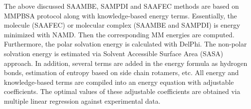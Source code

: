 \documentclass[9pt,tutorial,pubversion]{livecoms}
\begin{document}
The above discussed SAAMBE, SAMPDI and SAAFEC methods are based on MMPBSA protocol along with knowledge-based energy terms. Essentially, the molecule (SAAFEC) or molecular complex (SAAMBE and SAMPDI) is energy minimized with NAMD. Then the corresponding MM energies are computed. Furthermore, the polar solvation energy is calculated with DelPhi. The non-polar solvation energy is estimated via Solvent Accessible Surface Area (SASA) approach. In addition, several terms are added in the energy formula as hydrogen bonds, estimation of entropy based on side chain rotamers, etc. All energy and knowledge-based terms are compiled into an energy equation with adjustable coefficients. The optimal values of these adjustable coefficients are obtained via multiple linear regression against experimental data\cite{petukh2016saambe,peng2017predicting,getov2016saafec}.
\end{document}
